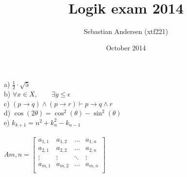 \documentclass{article}
\title{Logik exam 2014}
\author{Sebastian Andersen (xtf221)}
\date{October 2014}
\newcommand{\Fin}{
\vfill
\begin{center}
\textit{}\label{FIN}
\end{center}}
\begin{document}
a) $\frac{1}{2} \cdot \sqrt{5}$\\
b) $\forall{x} \in X, \hspace{2em} \exists{y \leq \epsilon}$\\
c) $(p \to q) \land (p \to r) \vdash p \to q \land r$\\
d) $\cos(2 \theta) = \cos^2(\theta) - \sin^2(\theta)$\\
e) $k_{k+1} = n^2 + k^2_n - k_{n-1}$\\\\
$Am,n =
\begin{bmatrix}
  a_{1,1} & a_{1,2} & \hdots & a_{1,n}\\
  a_{2,1} & a_{2,2} & \hdots & a_{2,n}\\
  \vdots & \vdots & \ddots & \vdots\\
  a_{m,1} & a_{m,2} & \hdots & a_{m,n}\\
\end{bmatrix}
$

%


\Fin
\end{document}
